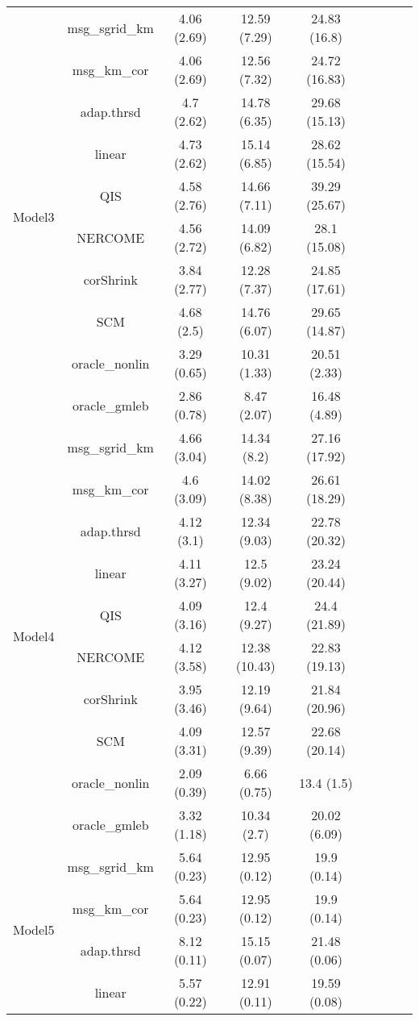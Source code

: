 \documentclass[useAMS,referee,usenatbib]{biom}
\begin{document}
\begin{table}[H]
{\begin{tabular}{ccccccccc}
 \multirow{10}{*}{Model3}   
 & msg\_sgrid\_km & 4.06 (2.69) & 12.59 (7.29) & 24.83 (16.8)  \\
 & msg\_km\_cor   & 4.06 (2.69) & 12.56 (7.32) & 24.72 (16.83) \\
 & adap.thrsd     & 4.7 (2.62)  & 14.78 (6.35) & 29.68 (15.13) \\
 & linear         & 4.73 (2.62) & 15.14 (6.85) & 28.62 (15.54) \\
 & QIS            & 4.58 (2.76) & 14.66 (7.11) & 39.29 (25.67) \\
 & NERCOME        & 4.56 (2.72) & 14.09 (6.82) & 28.1 (15.08)  \\
 & corShrink      & 3.84 (2.77) & 12.28 (7.37) & 24.85 (17.61) \\
 & SCM            & 4.68 (2.5)  & 14.76 (6.07) & 29.65 (14.87) \\
 & oracle\_nonlin & 3.29 (0.65) & 10.31 (1.33) & 20.51 (2.33)  \\
 & oracle\_gmleb  & 2.86 (0.78) & 8.47 (2.07)  & 16.48 (4.89)    \\ \midrule
\multirow{10}{*}{Model4}  
 & msg\_sgrid\_km & 4.66 (3.04) & 14.34 (8.2)   & 27.16 (17.92) \\
 & msg\_km\_cor   & 4.6 (3.09)  & 14.02 (8.38)  & 26.61 (18.29) \\
 & adap.thrsd     & 4.12 (3.1)  & 12.34 (9.03)  & 22.78 (20.32) \\
 & linear         & 4.11 (3.27) & 12.5 (9.02)   & 23.24 (20.44) \\
 & QIS            & 4.09 (3.16) & 12.4 (9.27)   & 24.4 (21.89)  \\
 & NERCOME        & 4.12 (3.58) & 12.38 (10.43) & 22.83 (19.13) \\
 & corShrink      & 3.95 (3.46) & 12.19 (9.64)  & 21.84 (20.96) \\
 & SCM            & 4.09 (3.31) & 12.57 (9.39)  & 22.68 (20.14) \\
 & oracle\_nonlin & 2.09 (0.39) & 6.66 (0.75)   & 13.4 (1.5)    \\
 & oracle\_gmleb  & 3.32 (1.18) & 10.34 (2.7)   & 20.02 (6.09)  \\ \midrule
\multirow{10}{*}{Model5}  
 & msg\_sgrid\_km & 5.64 (0.23) & 12.95 (0.12) & 19.9 (0.14)  \\
 & msg\_km\_cor   & 5.64 (0.23) & 12.95 (0.12) & 19.9 (0.14)  \\
 & adap.thrsd     & 8.12 (0.11) & 15.15 (0.07) & 21.48 (0.06) \\
 & linear         & 5.57 (0.22) & 12.91 (0.11) & 19.59 (0.08) \\

\end{tabular}}
\end{table}
\end{document}
